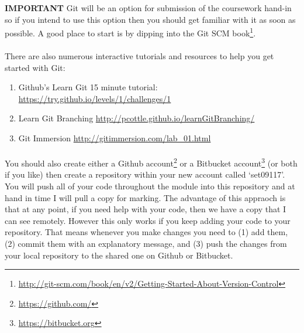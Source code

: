 \documentclass[10pt, a4paper, twosize]{article}
\begin{document}
\begin{framed}
\textbf{IMPORTANT} Git will be an option for submission of the coursework hand-in so if you intend to use this option then you should get familiar with it as soon as possible. A good place to start is by dipping into the Git SCM book\footnote{\url{http://git-scm.com/book/en/v2/Getting-Started-About-Version-Control}}.
\end{framed}

\paragraph{} There are also numerous interactive tutorials and resources to help you get started with Git:
\begin{enumerate}
\item Github's Learn Git 15 minute tutorial: \url{https://try.github.io/levels/1/challenges/1}
\item Learn Git Branching \url{http://pcottle.github.io/learnGitBranching/}
\item Git Immersion \url{http://gitimmersion.com/lab_01.html}
\end{enumerate}

\paragraph{} You should also create either a Github account\footnote{\url{https://github.com/}} or a Bitbucket account\footnote{\url{https://bitbucket.org}} (or both if you like) then create a repository within your new account called `set09117'. You will push all of your code throughout the module into this repository and at hand in time I will pull a copy for marking. The advantage of this appraoch is that at any point, if you need help with your code, then we have a copy that I can see remotely. However this only works if you keep adding your code to your repository. That means whenever you make changes you need to (1) add them, (2) commit them with an explanatory message,  and (3) push the changes from your local repository to the shared one on Github or Bitbucket.







\end{document}
